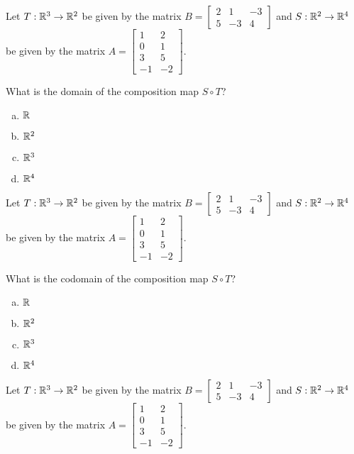 
\begin{applicationActivities}{1}{21}

\begin{activity}{5}
Let $T: \mathbb{R}^3 \rightarrow \mathbb{R}^2$ be given by the matrix $B=\begin{bmatrix} 2 & 1 & -3 \\ 5 & -3 & 4 \end{bmatrix}$ and $S: \mathbb{R}^2 \rightarrow \mathbb{R}^4$ be given by the matrix $A=\begin{bmatrix} 1 & 2 \\ 0 & 1 \\ 3 & 5 \\ -1 & -2 \end{bmatrix}$.

What is the domain of the composition map $S \circ T$?
\begin{enumerate}[(a)]
\item $\mathbb{R}$
\item $\mathbb{R}^2$
\item $\mathbb{R}^3$
\item $\mathbb{R}^4$
\end{enumerate}
\end{activity}

\begin{activity}{3}
Let $T: \mathbb{R}^3 \rightarrow \mathbb{R}^2$ be given by the matrix $B=\begin{bmatrix} 2 & 1 & -3 \\ 5 & -3 & 4 \end{bmatrix}$ and $S: \mathbb{R}^2 \rightarrow \mathbb{R}^4$ be given by the matrix $A=\begin{bmatrix} 1 & 2 \\ 0 & 1 \\ 3 & 5 \\ -1 & -2 \end{bmatrix}$.

What is the codomain of the composition map $S \circ T$?
\begin{enumerate}[(a)]
\item $\mathbb{R}$
\item $\mathbb{R}^2$
\item $\mathbb{R}^3$
\item $\mathbb{R}^4$
\end{enumerate}
\end{activity}

\begin{activity}{3}
Let $T: \mathbb{R}^3 \rightarrow \mathbb{R}^2$ be given by the matrix $B=\begin{bmatrix} 2 & 1 & -3 \\ 5 & -3 & 4 \end{bmatrix}$ and $S: \mathbb{R}^2 \rightarrow \mathbb{R}^4$ be given by the matrix $A=\begin{bmatrix} 1 & 2 \\ 0 & 1 \\ 3 & 5 \\ -1 & -2 \end{bmatrix}$.


\end{activity}
\end{applicationActivities}
